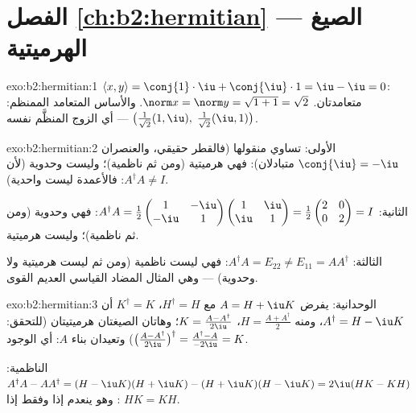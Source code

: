 \section*{الفصل \ref{ch:b2:hermitian} --- الصيغ الهرميتية}

\begin{solution}{exo:b2:hermitian:1}
$\langle x, y\rangle = \conj{1}\cdot\iu + \conj{\iu}\cdot 1 = \iu -
\iu = 0$: متعامدتان. $\norm x = \norm y = \sqrt{1 + 1} = \sqrt2$.
والأساس المتعامد الممنظم: $\bigl(\frac{1}{\sqrt2}(1, \iu),\;
\frac{1}{\sqrt2}(\iu, 1)\bigr)$ --- أي الزوج المنظَّم نفسه.
\end{solution}

\begin{solution}{exo:b2:hermitian:2}
الأولى: تساوي منقولها  (فالقطر حقيقي، والعنصران $\conj{\iu} =
-\iu$ متبادلان): فهي هرميتية (ومن ثم ناظمية)؛ وليست وحدوية (لأن $A^\dagger A
\neq I$: فالأعمدة ليست واحدية).

الثانية: $A^\dagger A = \frac12\begin{pmatrix} 1 & -\iu\\ -\iu &
1\end{pmatrix}\begin{pmatrix} 1 & \iu\\ \iu & 1\end{pmatrix} =
\frac12\begin{pmatrix} 2 & 0\\ 0 & 2\end{pmatrix} = I$: فهي وحدوية
(ومن ثم ناظمية)؛ وليست هرميتية.

الثالثة: $A^\dagger A = E_{22} \neq E_{11} = AA^\dagger$: فهي ليست ناظمية
(ومن ثم ليست هرميتية ولا وحدوية) --- وهي المثال المضاد
القياسي العديم القوى.
\end{solution}

\begin{solution}{exo:b2:hermitian:3}
الوحدانية: يفرض $A = H + \iu K$ مع $H^\dagger = H$، $K^\dagger = K$
أن $A^\dagger = H - \iu K$، ومنه $H = \frac{A + A^\dagger}{2}$،
$K = \frac{A - A^\dagger}{2\iu}$؛ وهاتان الصيغتان هرميتيتان
(للتحقق: $\bigl(\frac{A - A^\dagger}{2\iu}\bigr)^\dagger = \frac{
A^\dagger - A}{-2\iu} = K$) وتعيدان بناء $A$: أي الوجود.

الناظمية: $A^\dagger A - AA^\dagger = (H - \iu K)(H + \iu K) - (H
+ \iu K)(H - \iu K) = 2\iu(HK - KH)$: وهو ينعدم إذا وفقط إذا $HK = KH$.
\end{solution}

